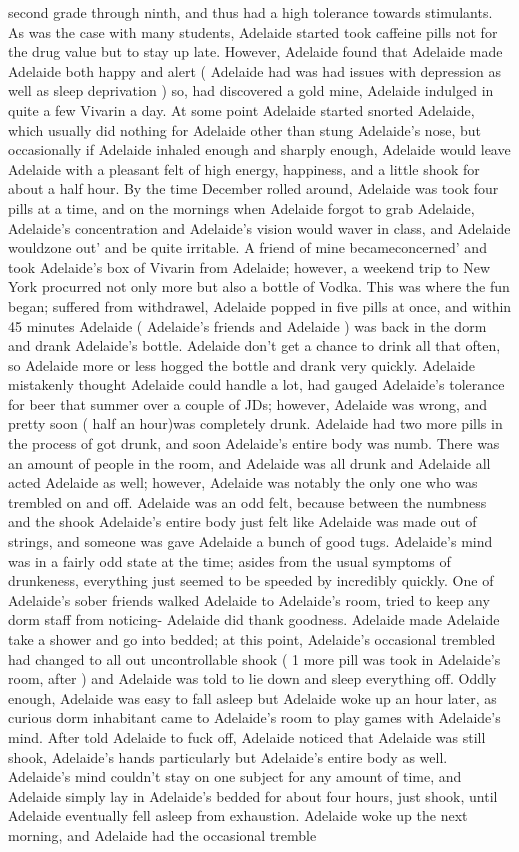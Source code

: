\documentclass[12pt]{book}
\begin{document}
second grade through ninth, and thus had a high tolerance towards stimulants. As was the case with many students, Adelaide started took caffeine pills not for the drug value but to stay up late. However, Adelaide found that Adelaide made Adelaide both happy and alert ( Adelaide had was had issues with depression as well as sleep deprivation ) so, had discovered a gold mine, Adelaide indulged in quite a few Vivarin a day. At some point Adelaide started snorted Adelaide, which usually did nothing for Adelaide other than stung Adelaide's nose, but occasionally if Adelaide inhaled enough and sharply enough, Adelaide would leave Adelaide with a pleasant felt of high energy, happiness, and a little shook for about a half hour. By the time December rolled around, Adelaide was took four pills at a time, and on the mornings when Adelaide forgot to grab Adelaide, Adelaide's concentration and Adelaide's vision would waver in class, and Adelaide wouldzone out' and be quite irritable. A friend of mine becameconcerned' and took Adelaide's box of Vivarin from Adelaide; however, a weekend trip to New York procurred not only more but also a bottle of Vodka. This was where the fun began; suffered from withdrawel, Adelaide popped in five pills at once, and within 45 minutes Adelaide ( Adelaide's friends and Adelaide ) was back in the dorm and drank Adelaide's bottle. Adelaide don't get a chance to drink all that often, so Adelaide more or less hogged the bottle and drank very quickly. Adelaide mistakenly thought Adelaide could handle a lot, had gauged Adelaide's tolerance for beer that summer over a couple of JDs; however, Adelaide was wrong, and pretty soon ( half an hour)was completely drunk. Adelaide had two more pills in the process of got drunk, and soon Adelaide's entire body was numb. There was an amount of people in the room, and Adelaide was all drunk and Adelaide all acted Adelaide as well; however, Adelaide was notably the only one who was trembled on and off. Adelaide was an odd felt, because between the numbness and the shook Adelaide's entire body just felt like Adelaide was made out of strings, and someone was gave Adelaide a bunch of good tugs. Adelaide's mind was in a fairly odd state at the time; asides from the usual symptoms of drunkeness, everything just seemed to be speeded by incredibly quickly. One of Adelaide's sober friends walked Adelaide to Adelaide's room, tried to keep any dorm staff from noticing- Adelaide did thank goodness. Adelaide made Adelaide take a shower and go into bedded; at this point, Adelaide's occasional trembled had changed to all out uncontrollable shook ( 1 more pill was took in Adelaide's room, after ) and Adelaide was told to lie down and sleep everything off. Oddly enough, Adelaide was easy to fall asleep but Adelaide woke up an hour later, as curious dorm inhabitant came to Adelaide's room to play games with Adelaide's mind. After told Adelaide to fuck off, Adelaide noticed that Adelaide was still shook, Adelaide's hands particularly but Adelaide's entire body as well. Adelaide's mind couldn't stay on one subject for any amount of time, and Adelaide simply lay in Adelaide's bedded for about four hours, just shook, until Adelaide eventually fell asleep from exhaustion. Adelaide woke up the next morning, and Adelaide had the occasional tremble 
\end{document}
